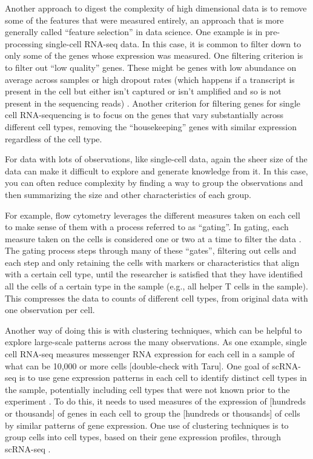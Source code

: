\documentclass[]{tufte-book}
\begin{document}
Another approach to digest the complexity of high dimensional data is to remove
some of the features that were measured entirely, an approach that is more
generally called ``feature selection'' in data science. One example is in
pre-processing single-cell RNA-seq data. In this case, it is common to filter
down to only some of the genes whose expression was measured. One filtering
criterion is to filter out ``low quality'' genes. These might be genes with low
abundance on average across samples or high dropout rates (which happens if
a transcript is present in the cell but either isn't captured or isn't amplified
and so is not present in the sequencing reads) \citep[
\citet{mccarthy2017scater}]{haque2017practical}. Another criterion for filtering genes for single cell
RNA-sequencing is to focus on the genes that vary substantially across different
cell types, removing the ``housekeeping'' genes with similar expression regardless
of the cell type.

For data with lots of observations, like single-cell data, again the sheer size
of the data can make it difficult to explore and generate knowledge from it. In
this case, you can often reduce complexity by finding a way to group the
observations and then summarizing the size and other characteristics of each
group.

For example, flow cytometry leverages the different measures taken on each cell
to make sense of them with a process referred to as ``gating''. In gating, each
measure taken on the cells is considered one or two at a time to filter the data
\citep{maecker2012standardizing}. The gating process steps through many of these
``gates'', filtering out cells and each step and only retaining the cells with
markers or characteristics that align with a certain cell type, until the
researcher is satisfied that they have identified all the cells of a certain
type in the sample (e.g., all helper T cells in the sample).
This compresses the data to counts of different cell types, from original
data with one observation per cell.

Another way of doing this is with clustering techniques, which can be helpful to
explore large-scale patterns across the many observations. As one example,
single cell RNA-seq measures messenger RNA expression for each cell in a sample
of what can be 10,000 or more cells {[}double-check with Taru{]}. One goal of
scRNA-seq is to use gene expression patterns in each cell to identify distinct
cell types in the sample, potentially including cell types that were not known
prior to the experiment \citep{perkel2017single}. To do this, it needs to used
measures of the expression of {[}hundreds or thousands{]} of genes in each cell to
group the {[}hundreds or thousands{]} of cells by similar patterns of gene
expression. One use of clustering techniques is to group cells into cell types,
based on their gene expression profiles, through scRNA-seq
\citep{haque2017practical}.
\end{document}
